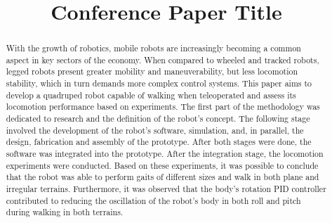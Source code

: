 \documentclass[conference]{IEEEtran}
\begin{document}
\title{Conference Paper Title\\
}

\author{
\and
{}
\and
{}
}

\maketitle

\begin{abstract}
With the growth of robotics, mobile robots are increasingly becoming a common aspect in key sectors of the economy. When compared to wheeled and tracked robots, legged robots present greater mobility and maneuverability, but less locomotion stability, which in turn demands more complex control systems. This paper aims to develop a quadruped robot capable of walking when teleoperated and assess its locomotion performance based on experiments. The first part of the methodology was dedicated to research and the definition of the robot's concept. The following stage involved the development of the robot's software, simulation, and, in parallel, the design, fabrication and assembly of the prototype. After both stages were done, the software was integrated into the prototype. After the integration stage, the locomotion experiments were conducted. Based on these experiments, it was possible to conclude that the robot was able to perform gaits of different sizes and walk in both plane and irregular terrains. Furthermore, it was observed that the body's rotation PID controller contributed to reducing the oscillation of the robot's body in both roll and pitch during walking in both terrains.
\end{abstract}
\end{document}
